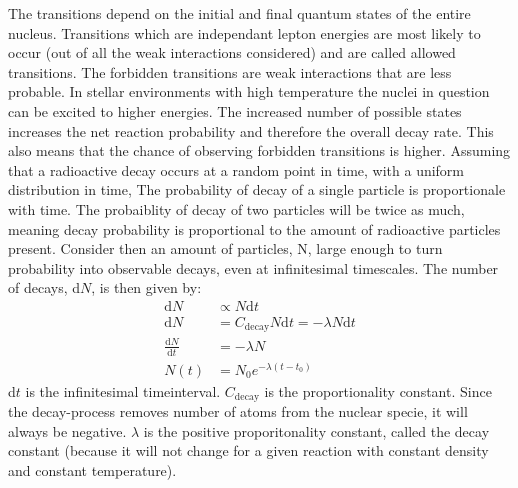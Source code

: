 The \betadecay transitions depend on the initial and final quantum states of the entire nucleus.
Transitions which are independant lepton energies are most likely to occur (out of all the weak interactions considered)
and are called allowed transitions.
The forbidden transitions are weak interactions that are less probable.
In stellar environments with high temperature the nuclei in question can be excited to higher energies.
The increased number of possible states increases the net reaction probability and therefore the overall decay rate.
This also means that the chance of observing forbidden transitions is higher.
Assuming that a radioactive decay occurs at a random point in time, with a uniform distribution in time,
The probability of decay of a single particle is proportionale with time.
The probaiblity of decay of two particles will be twice as much, meaning decay probability is
proportional to the amount of radioactive particles present.
Consider then an amount of particles, N,  large enough to turn probability into observable decays,
even at infinitesimal timescales. The number of decays, d$N$, is then given by:
\begin{equation}
  \begin{array}{rl}
    \textrm{d}N &\propto N \textrm{d}t \\
    \textrm{d}N &= C_{\textrm{decay}} N \textrm{d}t = -\lambda N \textrm{d}t\\
    \frac{\textrm{d}N}{\textrm{d}t} &= -\lambda N \\
    N(t) &= N_0 e^{-\lambda (t - t_0)}
  \end{array}
  \label{eq:decay-diff-eq}
\end{equation}
d$t$ is the infinitesimal timeinterval.
$C_{\textrm{decay}}$ is the proportionality constant.
Since the decay-process removes number of atoms from the nuclear specie, it will always be negative.
$\lambda$ is the positive proporitonality constant, called the decay constant (because it will not change for a given reaction with constant density and constant temperature).

